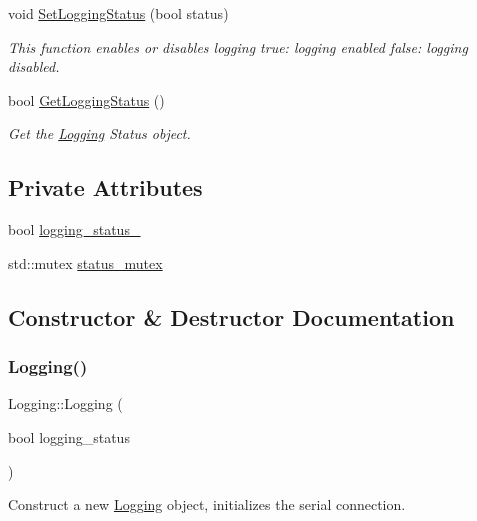 \begin{DoxyCompactItemize}
void \hyperlink{classLogging_a7eab89a46435adb76ea30a899e9658cc}{Set\+Logging\+Status} (bool status)
\begin{DoxyCompactList}\small\item\em This function enables or disables logging true\+: logging enabled false\+: logging disabled. \end{DoxyCompactList}\item 
bool \hyperlink{classLogging_a739f193cbcadcec708a6af983039759f}{Get\+Logging\+Status} ()
\begin{DoxyCompactList}\small\item\em Get the \hyperlink{classLogging}{Logging} Status object. \end{DoxyCompactList}\end{DoxyCompactItemize}
\subsection*{Private Attributes}
\begin{DoxyCompactItemize}
\item 
bool \hyperlink{classLogging_adc395a9b0a516df8528b6ef764877a58}{logging\+\_\+status\+\_\+}
\item 
std\+::mutex \hyperlink{classLogging_a9bc75091ce35d1448abf90ee07fc7ffa}{status\+\_\+mutex}
\end{DoxyCompactItemize}


\subsection{Constructor \& Destructor Documentation}
\mbox{\label{classLogging_a3180cbe3cd3f25a926092066a157b884}} 
\subsubsection{\texorpdfstring{Logging()}{Logging()}}
{\footnotesize\ttfamily Logging\+::\+Logging (\begin{DoxyParamCaption}\item[{bool}]{logging\+\_\+status }\end{DoxyParamCaption})}



Construct a new \hyperlink{classLogging}{Logging} object, initializes the serial connection. 

\mbox{\label{classLogging_af6a0971121f5b0d9d6ebfb4e69b20a4d}} 
